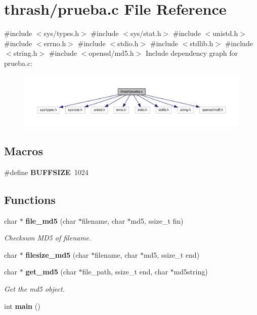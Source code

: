 \section{thrash/prueba.c File Reference}
\label{prueba_8c}
{\ttfamily \#include $<$sys/types.\+h$>$}\newline
{\ttfamily \#include $<$sys/stat.\+h$>$}\newline
{\ttfamily \#include $<$unistd.\+h$>$}\newline
{\ttfamily \#include $<$errno.\+h$>$}\newline
{\ttfamily \#include $<$stdio.\+h$>$}\newline
{\ttfamily \#include $<$stdlib.\+h$>$}\newline
{\ttfamily \#include $<$string.\+h$>$}\newline
{\ttfamily \#include $<$openssl/md5.\+h$>$}\newline
Include dependency graph for prueba.\+c\+:
\nopagebreak
\begin{figure}[H]
\begin{center}
\leavevmode
\includegraphics[width=350pt]{prueba_8c__incl}
\end{center}
\end{figure}
\subsection*{Macros}
\begin{DoxyCompactItemize}
\item 
\#define \textbf{ B\+U\+F\+F\+S\+I\+ZE}~1024
\end{DoxyCompactItemize}
\subsection*{Functions}
\begin{DoxyCompactItemize}
\item 
char $\ast$ \textbf{ file\+\_\+md5} (char $\ast$filename, char $\ast$md5, ssize\+\_\+t fin)
\begin{DoxyCompactList}\small\item\em Checksum M\+D5 of filename. \end{DoxyCompactList}\item 
char $\ast$ \textbf{ filesize\+\_\+md5} (char $\ast$filename, char $\ast$md5, ssize\+\_\+t end)
\item 
char $\ast$ \textbf{ get\+\_\+md5} (char $\ast$file\+\_\+path, ssize\+\_\+t end, char $\ast$md5string)
\begin{DoxyCompactList}\small\item\em Get the md5 object. \end{DoxyCompactList}\item 
int \textbf{ main} ()
\end{DoxyCompactItemize}



